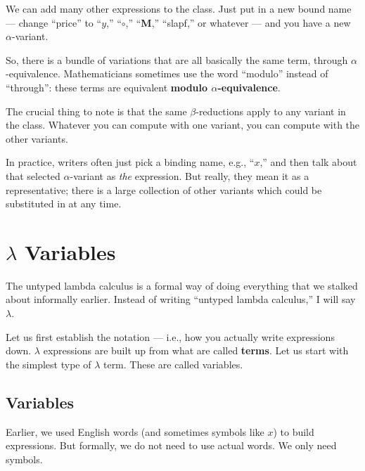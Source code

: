 \documentclass{book}
\numberwithin{equation}{chapter}
\newcommand{\vocab}{\textbf}
\begin{document}
We can add many other expressions to the class. Just put in a new bound name --- change ``price'' to ``$y$,'' ``$\circ$,'' ``\textbf{M},'' ``slapf,'' or whatever --- and you have a new $\alpha$-variant.

So, there is a bundle of variations that are all basically the same term, through $\alpha$-equivalence. Mathematicians sometimes use the word ``modulo'' instead of ``through'': these terms are equivalent \vocab{modulo $\alpha$-equivalence}.

The crucial thing to note is that the same $\beta$-reductions apply to any variant in the class. Whatever you can compute with one variant, you can compute with the other variants.

In practice, writers often just pick a binding name, e.g., ``$x$,'' and then talk about that selected $\alpha$-variant as \textit{the} expression. But really, they mean it as a representative; there is a large collection of other variants which could be substituted in at any time. 


\chapter{$\lambda$ Variables}

The untyped lambda calculus is a formal way of doing everything that we stalked about informally earlier. Instead of writing ``untyped lambda calculus,'' I will say $\lambda$.

Let us first establish the notation --- i.e., how you actually write expressions down. $\lambda$ expressions are built up from what are called \vocab{terms}. Let us start with the simplest type of $\lambda$ term. These are called variables.


\section{Variables}

Earlier, we used English words (and sometimes symbols like $x$) to build expressions. But formally, we do not need to use actual words. We only need symbols.
\end{document}
